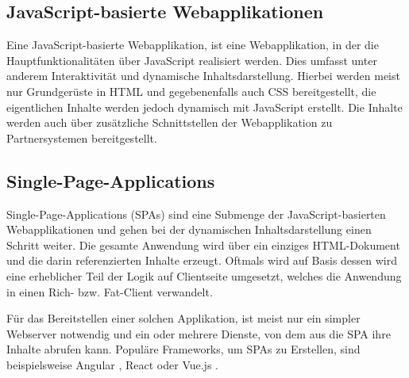 


\subsection{JavaScript-basierte Webapplikationen}

Eine JavaScript-basierte Webapplikation, ist eine Webapplikation, in der die Hauptfunktionalitäten über JavaScript realisiert werden. Dies umfasst unter anderem Interaktivität und dynamische Inhaltsdarstellung. Hierbei werden meist nur Grundgerüste in HTML und gegebenenfalls auch CSS bereitgestellt, die eigentlichen Inhalte werden jedoch dynamisch mit JavaScript erstellt. Die Inhalte werden auch über zusätzliche Schnittstellen der Webapplikation zu Partnersystemen bereitgestellt.

\subsection{Single-Page-Applications}
\label{subsec:singe-page-applications}

Single-Page-Applications (SPAs) sind eine Submenge der JavaScript-basierten Webapplikationen und gehen bei der dynamischen Inhaltsdarstellung einen Schritt weiter. Die gesamte Anwendung wird über ein einziges HTML-Dokument und die darin referenzierten Inhalte erzeugt. Oftmals wird auf Basis dessen wird eine erheblicher Teil der Logik auf Clientseite umgesetzt, welches die Anwendung in einen Rich- bzw. Fat-Client verwandelt.

Für das Bereitstellen einer solchen Applikation, ist meist nur ein simpler Webserver notwendig und ein oder mehrere Dienste, von dem aus die SPA ihre Inhalte abrufen kann. Populäre Frameworks, um SPAs zu Erstellen, sind beispielsweise Angular \cite{AngularHomepage}, React \cite{ReactHomepage} oder Vue.js \cite{VueJSHomepage}.

